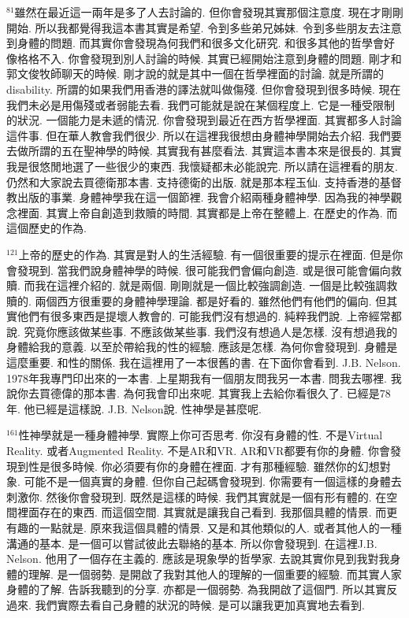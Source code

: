 \documentclass{book}
\begin{document}
$^{81}$雖然在最近這一兩年是多了人去討論的.
但你會發現其實那個注意度.
現在才剛剛開始.
所以我都覺得我這本書其實是希望.
令到多些弟兄姊妹.
令到多些朋友去注意到身體的問題.
而其實你會發現為何我們和很多文化研究.
和很多其他的哲學會好像格格不入.
你會發現到別人討論的時候.
其實已經開始注意到身體的問題.
剛才和郭文俊牧師聊天的時候.
剛才說的就是其中一個在哲學裡面的討論.
就是所謂的disability.
所謂的如果我們用香港的譯法就叫做傷殘.
但你會發現到很多時候.
現在我們未必是用傷殘或者弱能去看.
我們可能就是說在某個程度上.
它是一種受限制的狀況.
一個能力是未遞的情況.
你會發現到最近在西方哲學裡面.
其實都多人討論這件事.
但在華人教會我們很少.
所以在這裡我很想由身體神學開始去介紹.
我們要去做所謂的五在聖神學的時候.
其實我有甚麼看法.
其實這本書本來是很長的.
其實我是很悠閒地選了一些很少的東西.
我懷疑都未必能說完.
所以請在這裡看的朋友.
仍然和大家說去買德衛那本書.
支持德衛的出版.
就是那本程玉仙.
支持香港的基督教出版的事業.
身體神學我在這一個節裡.
我會介紹兩種身體神學.
因為我的神學觀念裡面.
其實上帝自創造到救贖的時間.
其實都是上帝在整體上.
在歷史的作為.
而這個歷史的作為.

$^{121}$上帝的歷史的作為.
其實是對人的生活經驗.
有一個很重要的提示在裡面.
但是你會發現到.
當我們說身體神學的時候.
很可能我們會偏向創造.
或是很可能會偏向救贖.
而我在這裡介紹的.
就是兩個.
剛剛就是一個比較強調創造.
一個是比較強調救贖的.
兩個西方很重要的身體神學理論.
都是好看的.
雖然他們有他們的偏向.
但其實他們有很多東西是提壞人教會的.
可能我們沒有想過的.
純粹我們說.
上帝經常都說.
究竟你應該做某些事.
不應該做某些事.
我們沒有想過人是怎樣.
沒有想過我的身體給我的意義.
以至於帶給我的性的經驗.
應該是怎樣.
為何你會發現到.
身體是這麼重要.
和性的關係.
我在這裡用了一本很舊的書.
在下面你會看到.
J.B. Nelson.
1978年我專門印出來的一本書.
上星期我有一個朋友問我另一本書.
問我去哪裡.
我說你去買德偉的那本書.
為何我會印出來呢.
其實我上去給你看很久了.
已經是78年.
他已經是這樣說.
J.B. Nelson說.
性神學是甚麼呢.

$^{161}$性神學就是一種身體神學.
實際上你可否思考.
你沒有身體的性.
不是Virtual Reality.
或者Augmented Reality.
不是AR和VR.
AR和VR都要有你的身體.
你會發現到性是很多時候.
你必須要有你的身體在裡面.
才有那種經驗.
雖然你的幻想對象.
可能不是一個真實的身體.
但你自己起碼會發現到.
你需要有一個這樣的身體去刺激你.
然後你會發現到.
既然是這樣的時候.
我們其實就是一個有形有體的.
在空間裡面存在的東西.
而這個空間.
其實就是讓我自己看到.
我那個具體的情景.
而更有趣的一點就是.
原來我這個具體的情景.
又是和其他類似的人.
或者其他人的一種溝通的基本.
是一個可以嘗試彼此去聯絡的基本.
所以你會發現到.
在這裡J.B. Nelson.
他用了一個存在主義的.
應該是現象學的哲學家.
去說其實你見到我對我身體的理解.
是一個弱勢.
是開啟了我對其他人的理解的一個重要的經驗.
而其實人家身體的了解.
告訴我聽到的分享.
亦都是一個弱勢.
為我開啟了這個門.
所以其實反過來.
我們實際去看自己身體的狀況的時候.
是可以讓我更加真實地去看到.
\end{document}
